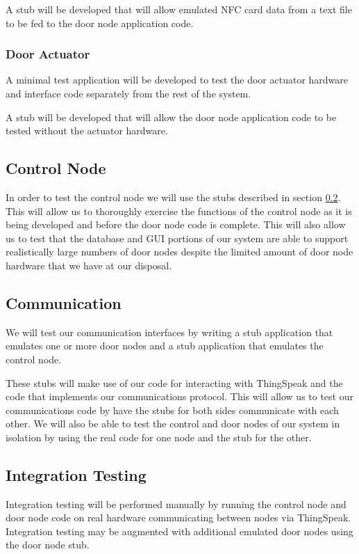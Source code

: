 A stub will be developed that will allow emulated NFC card data from a text file
to be fed to the door node application code.

\subsubsection{Door Actuator}

A minimal test application will be developed to test the door actuator hardware
and interface code separately from the rest of the system.

A stub will be developed that will allow the door node application code to be
tested without the actuator hardware.

\subsection{Control Node}

In order to test the control node we will use the stubs described in section
\ref{subsec:testing-communication}. This will allow us to thoroughly
exercise the functions of the control node as it is being developed and before
the door node code is complete. This will also allow us to test that the
database and GUI portions of our system are able to support realistically large
numbers of door nodes despite the limited amount of door node hardware that we
have at our disposal.

\subsection{Communication}
\label{subsec:testing-communication}

We will test our communication interfaces by writing a stub application that
emulates one or more door nodes and a stub application that emulates the control
node.

These stubs will make use of our code for interacting with ThingSpeak and the
code that implements our communications protocol. This will allow us to test our
communications code by have the stubs for both sides communicate with each
other. We will also be able to test the control and door nodes of our system in
isolation by using the real code for one node and the stub for the other.

\subsection{Integration Testing}

Integration testing will be performed manually by running the control node and
door node code on real hardware communicating between nodes via ThingSpeak.
Integration testing may be augmented with additional emulated door nodes using
the door node stub.

